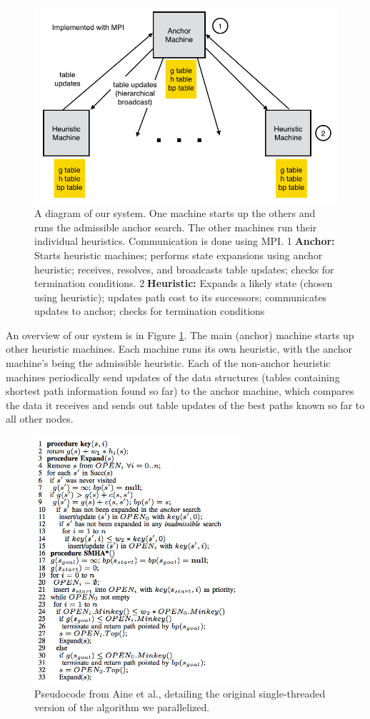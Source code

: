 \documentclass{article}
\begin{document}
\begin{figure}
\centering \includegraphics[width=5.0in]{system-diagram}
\caption{A diagram of our system. One machine starts up the others and runs the admissible anchor search. The other machines run their individual heuristics. Communication is done using MPI. 
\textcircled{1}\textbf{Anchor:} Starts heuristic machines; performs state expansions using anchor heuristic; receives, resolves, and broadcasts table updates; checks for termination conditions. \textcircled{2}\textbf{Heuristic:} Expands a likely state (chosen using heuristic); updates path cost to its successors; communicates updates to anchor; checks for termination conditions}
\label{fig:sysdiag}
\end{figure}

An overview of our system is in Figure \ref{fig:sysdiag}. The main (anchor) machine starts up other heuristic machines. Each machine runs its own heuristic, with the anchor machine's being the admissible heuristic. Each of the non-anchor heuristic machines periodically send updates of the data structures (tables containing shortest path information found so far) to the anchor machine, which compares the data it receives and sends out table updates of the best paths known so far to all other nodes.

\begin{figure}
\centering \includegraphics[width=3in]{pseudocode}
\caption{Pseudocode from Aine et al., detailing the original single-threaded version of the algorithm we parallelized.}
\label{fig:pseudocode}
\end{figure}
\end{document}
